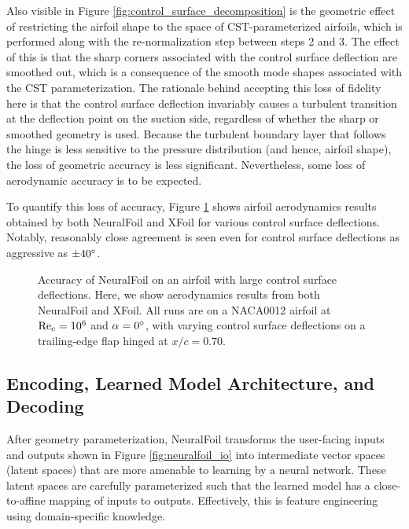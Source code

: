 \documentclass[journal]{new-aiaa}
\begin{document}
Also visible in Figure \ref{fig:control_surface_decomposition} is the geometric effect of restricting the airfoil shape to the space of CST-parameterized airfoils, which is performed along with the re-normalization step between steps 2 and 3. The effect of this is that the sharp corners associated with the control surface deflection are smoothed out, which is a consequence of the smooth mode shapes associated with the CST parameterization. The rationale behind accepting this loss of fidelity here is that the control surface deflection invariably causes a turbulent transition at the deflection point on the suction side, regardless of whether the sharp or smoothed geometry is used. Because the turbulent boundary layer that follows the hinge is less sensitive to the pressure distribution (and hence, airfoil shape), the loss of geometric accuracy is less significant. Nevertheless, some loss of aerodynamic accuracy is to be expected.

To quantify this loss of accuracy, Figure \ref{fig:control_surface_accuracy} shows airfoil aerodynamics results obtained by both NeuralFoil and XFoil for various control surface deflections. Notably, reasonably close agreement is seen even for control surface deflections as aggressive as $\pm40 \degree$.

\begin{figure}[H]
    \centering
            \caption{Accuracy of NeuralFoil on an airfoil with large control surface deflections. Here, we show aerodynamics results from both NeuralFoil and XFoil. All runs are on a NACA0012 airfoil at $\rm Re_c = 10^6$ and $\alpha = 0\degree$, with varying control surface deflections on a trailing-edge flap hinged at $x/c=0.70$.}
    \label{fig:control_surface_accuracy}
\end{figure}

\subsection{Encoding, Learned Model Architecture, and Decoding}

After geometry parameterization, NeuralFoil transforms the user-facing inputs and outputs shown in Figure \ref{fig:neuralfoil_io} into intermediate vector spaces (latent spaces) that are more amenable to learning by a neural network. These latent spaces are carefully parameterized such that the learned model has a close-to-affine mapping of inputs to outputs. Effectively, this is feature engineering using domain-specific knowledge.
\end{document}
